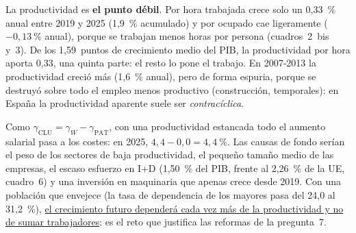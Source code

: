 \begin{examen}
La productividad es \textbf{el punto débil}. Por hora trabajada crece solo un 0,33~\% anual entre 2019 y 2025 (1,9~\% acumulado) y por ocupado cae ligeramente ($-0{,}13~\%$ anual), porque se trabajan menos horas por persona (cuadros~2~bis y~3). De los 1,59~puntos de crecimiento medio del PIB, la productividad por hora aporta 0,33, una quinta parte: el resto lo pone el trabajo. En 2007-2013 la productividad creció más (1,6~\% anual), pero de forma espuria, porque se destruyó sobre todo el empleo menos productivo (construcción, temporales): en España la productividad aparente suele ser \emph{contracíclica}.

Como $\gamma_{\mathrm{CLU}}=\gamma_W-\gamma_{\mathrm{PAT}}$, con una productividad estancada todo el aumento salarial pasa a los costes: en 2025, $4{,}4-0{,}0=4{,}4~\%$. Las causas de fondo serían el peso de los sectores de baja productividad, el pequeño tamaño medio de las empresas, el escaso esfuerzo en I+D (1,50~\% del PIB, frente al 2,26~\% de la UE, cuadro~6) y una inversión en maquinaria que apenas crece desde 2019. Con una población que envejece (la tasa de dependencia de los mayores pasa del 24,0 al 31,2~\%), \uline{el crecimiento futuro dependerá cada vez más de la productividad y no de sumar trabajadores}: es el reto que justifica las reformas de la pregunta~7.
\end{examen}

